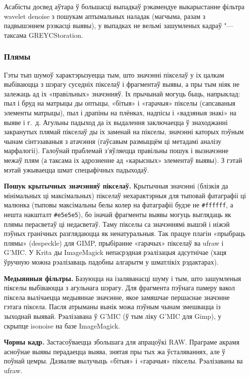 \documentclass[10pt, a5paper]{article}
\def\vv!#1!{\texttt{#1}}
\def\fakeparagraph#1{\textbf{#1}}
\begin{document}
{Асабісты досвед аўтара ў большасці выпадкаў рэкамендуе выкарыстанне фільтра wavelet denoise з пошукам аптымальных наладак (магчыма, разам з падвышэннем рэзкасці выявы), у выпадках не вельмі зашумленых кадраў "--- таксама GREYCStoration.}

\subsubsection*{Плямы}
Гэты тып шумоў характэрызуецца тым, што значэнні пікселаў у іх цалкам выбіваюцца з шэрагу суседніх пікселаў і фрагментаў выявы, а пры тым ніяк не залежаць ад іх «правільных» значэнняў. Іх прычынай могуць быць, напрыклад: пыл і бруд на матрыцы ды оптыцы, «бітыя» і «гарачыя» пікселы (сапсаваныя элементы матрыцы), пыл і драпіны на плёнках, надпісы і «вадзяныя знакі» на выяве і г.~д. Агульны падыход да іх выдалення заключаецца ў знаходжанні закранутых плямай пікселаў ды іх заменай на пікселы, значэнні каторых пэўным чынам сінтэзаваныя з атачэння (гаўсавым размыццём ці метадамі аналізу марфалогіі). Галоўнай праблемай з’яўляецца правільны пошук і вызначэнне межаў плям (а таксама іх адрозненне ад «карысных» элементаў выявы). З гэтай мэтай ужываецца шмат спецыфічных падыходаў.

\fakeparagraph{Пошук крытычных значэнняў пікселаў.}
Крытычныя значэнні (блізкія да мінімальных ці максімальных) пікселаў нехарактэрныя для тыповай фатаграфіі ці малюнка (тыповы максімальны белы колер на фатаграфіі будзе не \vv!\#ffffff!, а нешта накшталт \vv!\#e5e5e5!), бо іначай фрагменты выявы могуць выглядаць як плямы перасветаў ці недасветаў. Таму пікселы са значэннямі вышэй і ніжэй пэўных гранічных разглядаюцца як ненатуральныя. Так працуе плагін «прыбраць плямы» ({despeckle}) для {GIMP}, прыбіранне «гарачых» пікселаў ва {ufraw} і {G'MIC}. У {Krita} ды {ImageMagick} непасрэдная рэалізацыя адсутнічае (хаця ўручную можна рэалізаваць падобны алгарытм у шматлікіх рэдактарах).

\fakeparagraph{Медыянныя фільтры.}
Базуюцца на ізаляванасці шуму і тым, што зашумленыя пікселы выбіваюцца з агульнага шэрагу. Для фрагмента пэўнага памеру вакол піксела вылічаецца медыяннае значэнне, якое замяшчае першаснае значэнне гэтага піксела. Пасля атрыманы вынік можа пэўным чынам змешвацца із зыходнай выявай. Рэалізавана ў {G'MIC} (ў тым ліку {G'MIC для Gimp}), у скрыпце {isonoise} \cite{litvw3} на базе {ImageMagick}.

\fakeparagraph{Чорны кадр.}
Застасоўваецца збольшага для апрацоўкі RAW. Праграме акрамя асноўнае выявы перадаецца выява, знятая пры тых жа ўсталяваннях, але ў поўнай цемры. Дазваляе вылучыць «бітыя» і «гарачыя» пікселы. Рэалізаваны ва {ufraw}.
\end{document}
